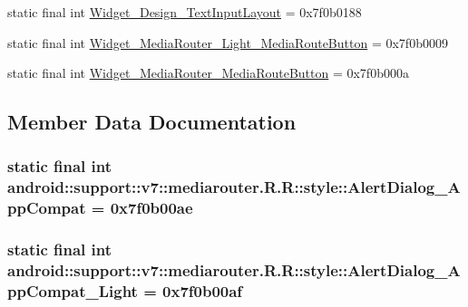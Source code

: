 \begin{CompactItemize}
\item 
static final int \hyperlink{classandroid_1_1support_1_1v7_1_1mediarouter_1_1_r_1_1style_488a345fdd07ffe11e7546bb3ebe8b86}{Widget\_\-Design\_\-TextInputLayout} = 0x7f0b0188
\item 
static final int \hyperlink{classandroid_1_1support_1_1v7_1_1mediarouter_1_1_r_1_1style_8a49f56b593629427134e9c57f002a46}{Widget\_\-MediaRouter\_\-Light\_\-MediaRouteButton} = 0x7f0b0009
\item 
static final int \hyperlink{classandroid_1_1support_1_1v7_1_1mediarouter_1_1_r_1_1style_3659944f3d59c6c75f7743a1899617b3}{Widget\_\-MediaRouter\_\-MediaRouteButton} = 0x7f0b000a
\end{CompactItemize}


\subsection{Member Data Documentation}
\hypertarget{classandroid_1_1support_1_1v7_1_1mediarouter_1_1_r_1_1style_3b8061b736bc67d1f9dfd883b52ed477}{
\subsubsection[{AlertDialog\_\-AppCompat}]{\setlength{\rightskip}{0pt plus 5cm}static final int android::support::v7::mediarouter.R.R::style::AlertDialog\_\-AppCompat = 0x7f0b00ae}}
\label{classandroid_1_1support_1_1v7_1_1mediarouter_1_1_r_1_1style_3b8061b736bc67d1f9dfd883b52ed477}


\hypertarget{classandroid_1_1support_1_1v7_1_1mediarouter_1_1_r_1_1style_65a34c04d9c5fd27984e27fe1566d8a2}{
\subsubsection[{AlertDialog\_\-AppCompat\_\-Light}]{\setlength{\rightskip}{0pt plus 5cm}static final int android::support::v7::mediarouter.R.R::style::AlertDialog\_\-AppCompat\_\-Light = 0x7f0b00af}}
\label{classandroid_1_1support_1_1v7_1_1mediarouter_1_1_r_1_1style_65a34c04d9c5fd27984e27fe1566d8a2}


